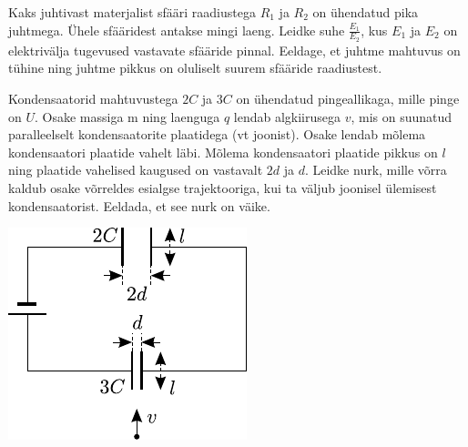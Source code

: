 \documentclass[10pt, twoside]{article}
\begin{document}
{%

Kaks juhtivast materjalist sfääri raadiustega $R_1$ ja $R_2$ on ühendatud pika 
juhtmega. Ühele sfääridest antakse mingi laeng. Leidke suhe $\frac{E_1}{E_2}$, kus
$E_1$ ja $E_2$ on elektrivälja tugevused vastavate sfääride pinnal. Eeldage, et
juhtme mahtuvus on tühine ning juhtme pikkus on oluliselt suurem sfääride
raadiustest.
\probend
\newpage

\bigskip


Kondensaatorid mahtuvustega $2C$ ja $3C$ on ühendatud pingeallikaga, mille pinge on $U$. Osake massiga m ning laenguga $q$ lendab algkiirusega $v$, mis on suunatud paralleelselt kondensaatorite plaatidega (vt joonist). Osake lendab mõlema kondensaatori plaatide vahelt läbi. Mõlema kondensaatori plaatide pikkus on $l$ ning plaatide vahelised kaugused on vastavalt $2d$ ja $d$. Leidke nurk, mille võrra kaldub osake võrreldes esialgse trajektooriga, kui ta väljub joonisel ülemisest kondensaatorist. Eeldada, et see nurk on väike.

\begin{center}
	\includegraphics[width=0.6\linewidth]{2005-v3g-08-yl}
\end{center}
\probend
\bigskip


}
\end{document}
